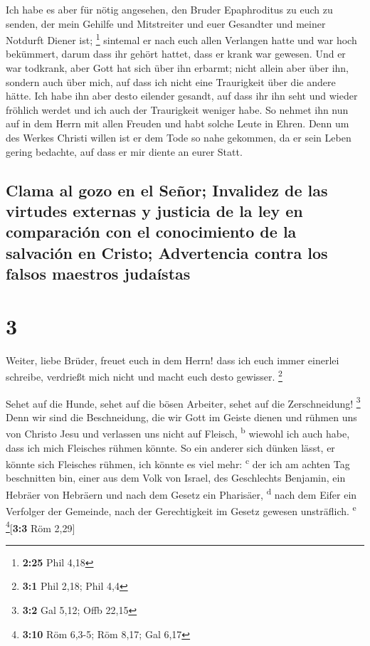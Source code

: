  Ich habe es aber für nötig angesehen, den Bruder
Epaphroditus zu euch zu senden, der mein Gehilfe und Mitstreiter und
euer Gesandter und meiner Notdurft Diener ist; \footnote{\textbf{2:25}
  Phil 4,18}  sintemal er nach euch allen Verlangen hatte
und war hoch bekümmert, darum dass ihr gehört hattet, dass er krank war
gewesen.  Und er war todkrank, aber Gott hat sich über
ihn erbarmt; nicht allein aber über ihn, sondern auch über mich, auf
dass ich nicht eine Traurigkeit über die andere hätte. 
Ich habe ihn aber desto eilender gesandt, auf dass ihr ihn seht und
wieder fröhlich werdet und ich auch der Traurigkeit weniger habe.
 So nehmet ihn nun auf in dem Herrn mit allen Freuden und
habt solche Leute in Ehren.  Denn um des Werkes Christi
willen ist er dem Tode so nahe gekommen, da er sein Leben gering
bedachte, auf dass er mir diente an eurer Statt.

\hypertarget{clama-al-gozo-en-el-seuxf1or-invalidez-de-las-virtudes-externas-y-justicia-de-la-ley-en-comparaciuxf3n-con-el-conocimiento-de-la-salvaciuxf3n-en-cristo-advertencia-contra-los-falsos-maestros-judauxedstas}{%
\subsection{Clama al gozo en el Señor; Invalidez de las virtudes
externas y justicia de la ley en comparación con el conocimiento de la
salvación en Cristo; Advertencia contra los falsos maestros
judaístas}\label{clama-al-gozo-en-el-seuxf1or-invalidez-de-las-virtudes-externas-y-justicia-de-la-ley-en-comparaciuxf3n-con-el-conocimiento-de-la-salvaciuxf3n-en-cristo-advertencia-contra-los-falsos-maestros-judauxedstas}}

\hypertarget{section-2}{%
\section{3}\label{section-2}}

 Weiter, liebe Brüder, freuet euch in dem Herrn! dass ich
euch immer einerlei schreibe, verdrießt mich nicht und macht euch desto
gewisser. \footnote{\textbf{3:1} Phil 2,18; Phil 4,4}

 Sehet auf die Hunde, sehet auf die bösen Arbeiter, sehet
auf die Zerschneidung! \footnote{\textbf{3:2} Gal 5,12; Offb 22,15}
 Denn wir sind die Beschneidung, die wir Gott im Geiste
dienen und rühmen uns von Christo Jesu und verlassen uns nicht auf
Fleisch, \textsuperscript{b}  wiewohl ich auch habe, dass
ich mich Fleisches rühmen könnte. So ein anderer sich dünken lässt, er
könnte sich Fleisches rühmen, ich könnte es viel mehr:
\textsuperscript{c}  der ich am achten Tag beschnitten
bin, einer aus dem Volk von Israel, des Geschlechts Benjamin, ein
Hebräer von Hebräern und nach dem Gesetz ein Pharisäer,
\textsuperscript{d}  nach dem Eifer ein Verfolger der
Gemeinde, nach der Gerechtigkeit im Gesetz gewesen unsträflich.
\textsuperscript{e} \footnote{\textbf{3:10} Röm 6,3-5; Röm 8,17; Gal
  6,17}{[}\textbf{3:3} Röm 2,29{]}

